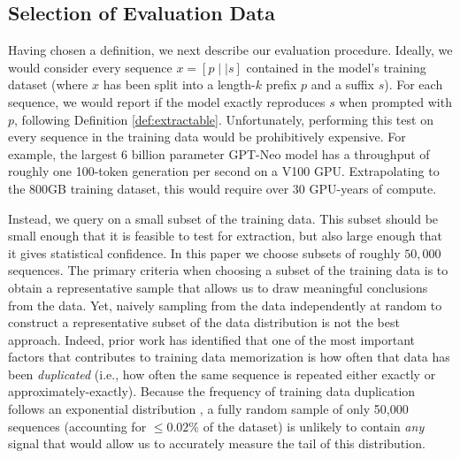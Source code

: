 \subsection{Selection of Evaluation Data}

Having chosen a definition, we next describe our evaluation procedure.
%
Ideally, we would consider every sequence $x=[p \mid \mid s]$ contained in the model's training dataset (where $x$ has been split into a length-$k$ prefix $p$ and a suffix $s$). For each sequence, we would report if the model exactly reproduces $s$ when prompted with $p$, following Definition \ref{def:extractable}.
Unfortunately, performing this test on every sequence in the training data would be prohibitively expensive.
For example, the largest 6 billion parameter GPT-Neo model has a throughput of roughly one 100-token generation per second on a V100 GPU. Extrapolating to the 800GB training dataset, this would require over $30$ GPU-years of compute.

Instead, we query on a small subset of the training data.
%
This subset should be small enough that it is feasible to test for extraction, 
but also large enough that
it gives statistical confidence.
%
In this paper we choose subsets of roughly $50{,}000$ sequences.
The primary criteria when choosing a subset of the training data is to obtain a representative sample that allows
us to draw meaningful conclusions from the data.
%
Yet, naively sampling from the data independently at random to construct a representative subset of the data distribution is not the best approach.
Indeed, prior work has identified that one of the most important factors that contributes to training data memorization is how often that data has been \emph{duplicated} (i.e., how often the same sequence is repeated either exactly or approximately-exactly).
%
Because the frequency of training data duplication follows an exponential distribution \citep{2021dedup}, a fully random sample of only 50,000 sequences
(accounting for $\le 0.02\%$ of the dataset)
is unlikely to contain \emph{any} signal that would allow us to 
accurately measure the tail of this distribution.




